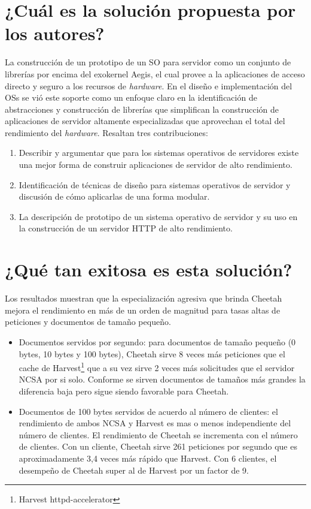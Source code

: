 \section{¿Cuál es la solución propuesta por los autores?}
La construcción de un prototipo de un SO para servidor como un conjunto de librerías por encima del exokernel Aegis, el cual provee a la aplicaciones de acceso directo y seguro a los recursos de \textit{hardware}. En el diseño e implementación del OSs se vió este soporte como un enfoque claro en la identificación de abstracciones y construcción de librerías que simplifican la construcción de aplicaciones de servidor altamente especializadas que aprovechan el total del rendimiento del \textit{hardware}.
Resaltan tres contribuciones:
\begin{enumerate}
    \item Describir y argumentar que para los sistemas operativos de servidores existe una mejor forma de construir aplicaciones de servidor de alto rendimiento.
    \item Identificación de técnicas de diseño para sistemas operativos de servidor y discusión de cómo aplicarlas de una forma modular.
    \item La descripción de prototipo de un sistema operativo de servidor y su uso en la construcción de un servidor HTTP de alto rendimiento.
\end{enumerate}


\section{¿Qué tan exitosa es esta solución?}
Los resultados muestran que la especialización agresiva que brinda Cheetah mejora el rendimiento en más de un orden de magnitud para tasas altas de peticiones y documentos de tamaño pequeño. 
\begin{itemize}
    \item Documentos servidos por segundo: para documentos de tamaño pequeño (0 bytes, 10 bytes y 100 bytes), Cheetah sirve 8 veces más peticiones que el cache de Harvest\footnote{Harvest httpd-accelerator} que a su vez sirve 2 veces más solicitudes que el servidor NCSA por si solo. Conforme se sirven documentos de tamaños más grandes la diferencia baja pero sigue siendo favorable para Cheetah.
    \item Documentos de 100 bytes servidos de acuerdo al número de clientes: el rendimiento de ambos NCSA y Harvest es mas o menos independiente del número de clientes. El rendimiento de Cheetah se incrementa con el número de clientes. Con un cliente, Cheetah sirve 261 peticiones por segundo que es aproximadamente 3,4 veces más rápido que Harvest. Con 6 clientes, el desempeño de Cheetah super al de Harvest por un factor de 9.
\end{itemize}


 